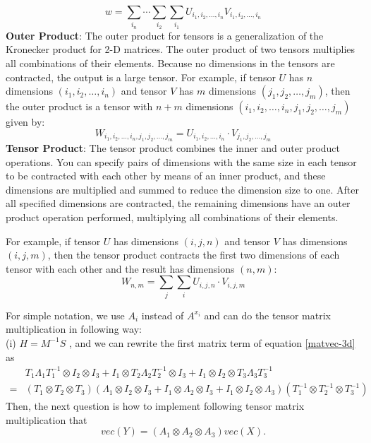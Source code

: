 \begin{equation*}
    w = \sum_{i_n}\cdots\sum_{i_2}\sum_{i_1}U_{i_1,i_2,\ldots,i_n}V_{i_1,i_2,\ldots,i_n}
\end{equation*}
\textbf{Outer Product}: 
The outer product for tensors is a generalization of the Kronecker product for 2-D matrices. The outer product of two tensors multiplies all combinations of their elements. Because no dimensions in the tensors are contracted, the output is a large tensor.
For example, if tensor $U$ has $n$ dimensions $(i_1, i_2,\ldots,i_n)$ and tensor $V$ has $m$ dimensions $(j_1, j_2,\ldots,j_m)$, then the outer product  is a tensor with $n+m$ dimensions $(i_1, i_2,\ldots,i_n,j_1, j_2,\ldots,j_m)$ given by:
\begin{equation*}
    W_{i_1,i_2,\ldots,i_n,j_1,j_2,\ldots,j_m} = U_{i_1,i_2,\ldots,i_n}\cdot V_{j_1,j_2,\ldots,j_m}
\end{equation*}
\textbf{Tensor Product}: The tensor product combines the inner and outer product operations. You can specify pairs of dimensions with the same size in each tensor to be contracted with each other by means of an inner product, and these dimensions are multiplied and summed to reduce the dimension size to one. After all specified dimensions are contracted, the remaining dimensions have an outer product operation performed, multiplying all combinations of their elements.

For example, if tensor $U$ has dimensions $(i, j, n)$ and tensor $V$ has dimensions $(i, j, m)$, then the tensor product  contracts the first two dimensions of each tensor with each other and the result has dimensions $(n, m)$:
\begin{equation*}
    W_{n,m} = \sum_{j}\sum_{i}U_{i,j,n}\cdot V_{i,j,m}
\end{equation*}

For simple notation, we use $A_{i}$ instead of $A^{x_i}$ and can do the tensor matrix multiplication in following way:\\
(i) $H = M^{-1}S$ ,  and we can rewrite the first matrix term of equation \eqref{matvec-3d} as
\begin{align*}
    & T_{1}\Lambda_{1}T_{1}^{-1}\otimes I_2\otimes I_3 + I_1\otimes T_{2}\Lambda_{2}T_{2}^{-1}\otimes  I_3 + I_1\otimes  I_2\otimes T_{3}\Lambda_{3}T_{3}^{-1}\\
    =& \left(T_1\otimes T_2\otimes T_3\right)\left(\Lambda_1\otimes I_2\otimes I_3 + I_1\otimes \Lambda_2\otimes I_3 + I_1\otimes I_2\otimes \Lambda_3\right)\left(T^{-1}_1\otimes T^{-1}_2\otimes T^{-1}_3\right)
\end{align*}
Then, the next question is how to implement following tensor matrix multiplication that
\begin{equation}\label{basic}
    vec(Y) = (A_1\otimes A_2 \otimes A_3)vec(X).
\end{equation}

